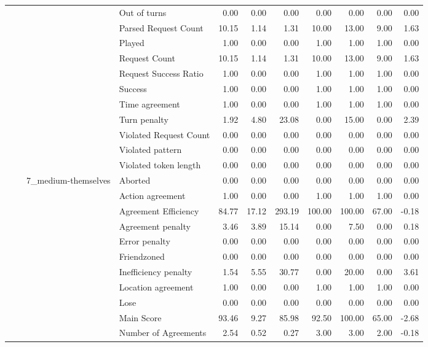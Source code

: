 \begin{tabular}{llllrrrrrrr}
 &  &  & Out of turns & 0.00 & 0.00 & 0.00 & 0.00 & 0.00 & 0.00 & 0.00 \\
 &  &  & Parsed Request Count & 10.15 & 1.14 & 1.31 & 10.00 & 13.00 & 9.00 & 1.63 \\
 &  &  & Played & 1.00 & 0.00 & 0.00 & 1.00 & 1.00 & 1.00 & 0.00 \\
 &  &  & Request Count & 10.15 & 1.14 & 1.31 & 10.00 & 13.00 & 9.00 & 1.63 \\
 &  &  & Request Success Ratio & 1.00 & 0.00 & 0.00 & 1.00 & 1.00 & 1.00 & 0.00 \\
 &  &  & Success & 1.00 & 0.00 & 0.00 & 1.00 & 1.00 & 1.00 & 0.00 \\
 &  &  & Time agreement & 1.00 & 0.00 & 0.00 & 1.00 & 1.00 & 1.00 & 0.00 \\
 &  &  & Turn penalty & 1.92 & 4.80 & 23.08 & 0.00 & 15.00 & 0.00 & 2.39 \\
 &  &  & Violated Request Count & 0.00 & 0.00 & 0.00 & 0.00 & 0.00 & 0.00 & 0.00 \\
 &  &  & Violated pattern & 0.00 & 0.00 & 0.00 & 0.00 & 0.00 & 0.00 & 0.00 \\
 &  &  & Violated token length & 0.00 & 0.00 & 0.00 & 0.00 & 0.00 & 0.00 & 0.00 \\
\cline{3-11}
 &  & \multirow[t]{27}{*}{7_medium-themselves} & Aborted & 0.00 & 0.00 & 0.00 & 0.00 & 0.00 & 0.00 & 0.00 \\
 &  &  & Action agreement & 1.00 & 0.00 & 0.00 & 1.00 & 1.00 & 1.00 & 0.00 \\
 &  &  & Agreement Efficiency & 84.77 & 17.12 & 293.19 & 100.00 & 100.00 & 67.00 & -0.18 \\
 &  &  & Agreement penalty & 3.46 & 3.89 & 15.14 & 0.00 & 7.50 & 0.00 & 0.18 \\
 &  &  & Error penalty & 0.00 & 0.00 & 0.00 & 0.00 & 0.00 & 0.00 & 0.00 \\
 &  &  & Friendzoned & 0.00 & 0.00 & 0.00 & 0.00 & 0.00 & 0.00 & 0.00 \\
 &  &  & Inefficiency penalty & 1.54 & 5.55 & 30.77 & 0.00 & 20.00 & 0.00 & 3.61 \\
 &  &  & Location agreement & 1.00 & 0.00 & 0.00 & 1.00 & 1.00 & 1.00 & 0.00 \\
 &  &  & Lose & 0.00 & 0.00 & 0.00 & 0.00 & 0.00 & 0.00 & 0.00 \\
 &  &  & Main Score & 93.46 & 9.27 & 85.98 & 92.50 & 100.00 & 65.00 & -2.68 \\
 &  &  & Number of Agreements & 2.54 & 0.52 & 0.27 & 3.00 & 3.00 & 2.00 & -0.18 \\

\end{tabular}
